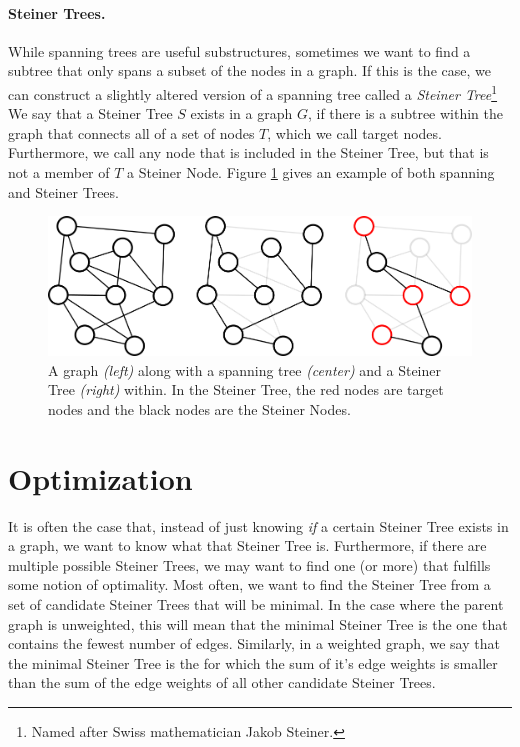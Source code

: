 \documentclass[12pt,twoside]{reedthesis}
\theoremstyle{definition}
\begin{document}
   \paragraph{Steiner Trees.}While spanning trees are useful substructures, sometimes we want to find a subtree that only spans a subset of the nodes in a graph. If this is the case, we can construct a slightly altered version of a spanning tree called a \textit{Steiner Tree}\footnote{Named after Swiss mathematician Jakob Steiner.} We say that a Steiner Tree $S$ exists in a graph $G$, if there is a subtree within the graph that connects all of a set of nodes $T$, which we call target nodes. Furthermore, we call any node that is included in the Steiner Tree, but that is not a member of $T$ a Steiner Node. Figure \ref{fig:graph1} gives an example of both spanning and Steiner Trees.

   \begin{figure}[!h]
     \begin{center}
       \includegraphics[width=\textwidth]{graph1}
     \caption[Spanning and Steiner Trees.]{A graph \textit{(left)} along with a spanning tree \textit{(center)} and a Steiner Tree \textit{(right)} within. In the Steiner Tree, the red nodes are target nodes and the black nodes are the Steiner Nodes.}
     \label{fig:graph1}
     \end{center}
   \end{figure}

 \section{Optimization}

 It is often the case that, instead of just knowing \emph{if} a certain Steiner Tree exists in a graph, we want to know what that Steiner Tree is. Furthermore, if there are multiple possible Steiner Trees, we may want to find one (or more) that fulfills some notion of optimality. Most often, we want to find the Steiner Tree from a set of candidate Steiner Trees that will be minimal. In the case where the parent graph is unweighted, this will mean that the minimal Steiner Tree is the one that contains the fewest number of edges. Similarly, in a weighted graph, we say that the minimal Steiner Tree is the for which the sum of it's edge weights is smaller than the sum of the edge weights of all other candidate Steiner Trees.
\end{document}
